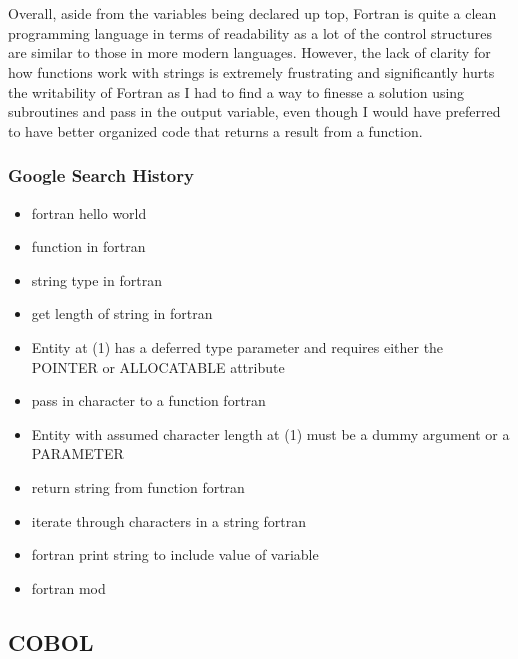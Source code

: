 \documentclass[letterpaper, 10pt, DIV=13]{scrartcl}
\numberwithin{equation}{section}
\numberwithin{figure}{section}
\numberwithin{table}{section}
\begin{document}
\\ \\
Overall, aside from the variables being declared up top, Fortran is quite a clean programming language in terms of readability as a lot of the control structures are similar to those in more modern languages. However, the lack of clarity for how functions work with strings is extremely frustrating and significantly hurts the writability of Fortran as I had to find a way to finesse a solution using subroutines and pass in the output variable, even though I would have preferred to have better organized code that returns a result from a function.

\subsubsection{Google Search History}

\begin{itemize}
	\item fortran hello world
	\item function in fortran
	\item string type in fortran
	\item get length of string in fortran
	\item Entity at (1) has a deferred type parameter and requires either the POINTER or ALLOCATABLE attribute
	\item pass in character to a function fortran
	\item Entity with assumed character length at (1) must be a dummy argument or a PARAMETER
	\item return string from function fortran
	\item iterate through characters in a string fortran
	\item fortran print string to include value of variable
	\item fortran mod
\end{itemize}


\subsection{COBOL}
\end{document}

